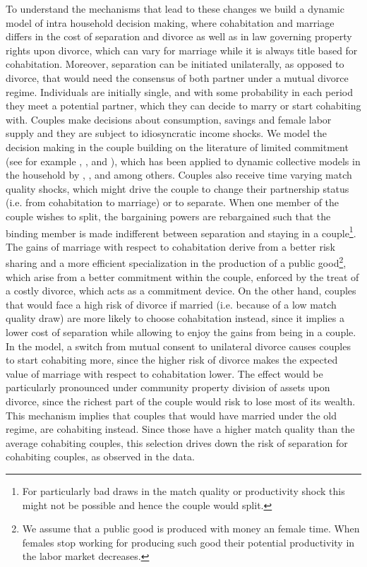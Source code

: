 \documentclass[12pt]{article}
\numberwithin{table}{section}
\begin{document}
To understand the mechanisms that lead to these changes we build a dynamic model of intra household decision making, where cohabitation and marriage differs in the cost of separation and divorce as well as in law governing property rights upon divorce, which can vary for marriage while it is always title based for cohabitation. Moreover, separation can be initiated unilaterally, as opposed to divorce, that would need the consensus of both partner under a mutual divorce regime. Individuals are initially single, and with some probability in each period they meet a potential partner, which they can decide to marry or start cohabiting with. Couples make decisions about consumption, savings and female labor supply and they are subject to idiosyncratic income shocks.  We model the decision making in the couple building on the literature of limited commitment (see for example \cite{kk1996},  \cite{ligon2002}, \cite{marcet2019} and \cite{pavoni2018}), which has been applied to dynamic collective models in the household by \cite{voena2015}, \cite{mazzocco2007}, \cite{foerster2019} and \cite{lise2018} among others. Couples also receive time varying match quality shocks, which might drive the couple to change their partnership status (i.e. from cohabitation to marriage) or to separate. When one member of the couple wishes to split, the bargaining powers are rebargained such that the binding member is made indifferent between separation and staying in a couple\footnote{For particularly bad draws in the match quality or productivity shock this might not be possible and hence the couple would split.}. The gains of marriage with respect to cohabitation derive from a better risk sharing and a more efficient specialization in the production of a public good\footnote{We assume that a public good is produced with money an female time. When females stop working for producing such good their potential productivity in the labor market decreases.}, which arise from a better commitment within the couple, enforced by the treat of a costly divorce, which acts as a commitment device. On the other hand, couples that would face a high risk of divorce if married (i.e. because of a low match quality draw) are more likely to choose cohabitation instead, since it implies a lower cost of separation while allowing to enjoy the gains from being in a couple. In the model, a switch from mutual consent to unilateral divorce causes couples to start cohabiting more, since the higher risk of divorce makes the expected value of marriage with respect to cohabitation lower. The effect would be particularly pronounced under community property division of assets upon divorce, since the richest part of the couple  would risk to lose most of its wealth. This mechanism implies that couples that would have married under the old regime, are cohabiting instead. Since those have a higher match quality than the average cohabiting couples, this selection drives down the risk of separation for cohabiting couples, as observed in the data.
\end{document}
